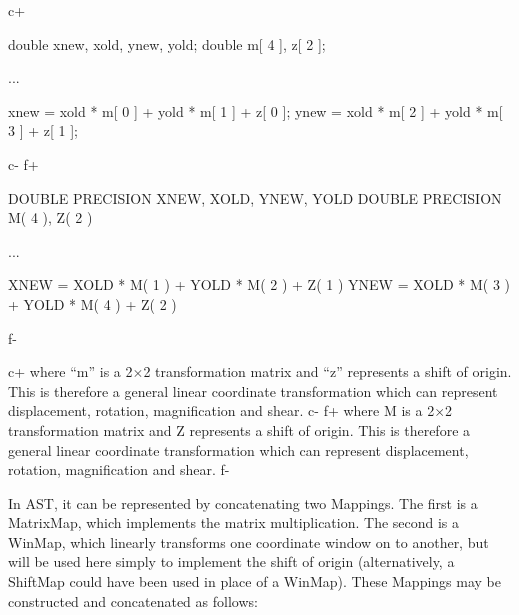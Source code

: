 \documentclass[twoside,11pt]{starlink}
\begin{document}
c+
\begin{small}
\begin{terminalv}
double xnew, xold, ynew, yold;
double m[ 4 ], z[ 2 ];

...

xnew = xold * m[ 0 ] + yold * m[ 1 ] + z[ 0 ];
ynew = xold * m[ 2 ] + yold * m[ 3 ] + z[ 1 ];
\end{terminalv}
\end{small}
c-
f+
\begin{small}
\begin{terminalv}
      DOUBLE PRECISION XNEW, XOLD, YNEW, YOLD
      DOUBLE PRECISION M( 4 ), Z( 2 )

      ...

      XNEW = XOLD * M( 1 ) + YOLD * M( 2 ) + Z( 1 )
      YNEW = XOLD * M( 3 ) + YOLD * M( 4 ) + Z( 2 )
\end{terminalv}
\end{small}
f-

c+
where ``m'' is a 2$\times$2 transformation matrix and ``z'' represents
a shift of origin. This is therefore a general linear coordinate
transformation which can represent displacement, rotation,
magnification and shear.
c-
f+
where M is a 2$\times$2 transformation matrix and Z represents a shift
of origin. This is therefore a general linear coordinate
transformation which can represent displacement, rotation,
magnification and shear.
f-

In AST, it can be represented by concatenating two Mappings. The first
is a MatrixMap, which implements the matrix multiplication. The second
is a WinMap, which linearly transforms one coordinate window on to
another, but will be used here simply to implement the shift of
origin (alternatively, a ShiftMap could have been used in place of a
WinMap). These Mappings may be constructed and concatenated as follows:
\end{document}
